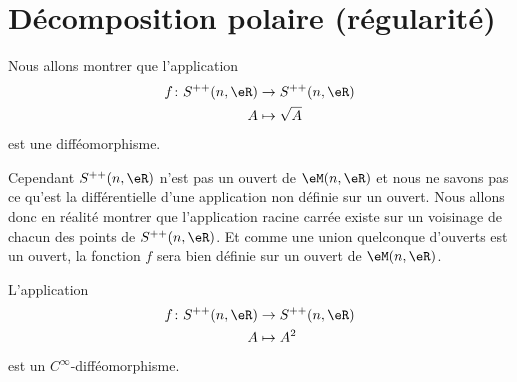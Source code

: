 \section{Décomposition polaire (régularité)}

\begin{normaltext}      \label{NomDJMUooTRUVkS}
    Nous allons montrer que l'application
    \begin{equation}
        \begin{aligned}
            f\colon S^{++}(n,\eR)&\to S^{++}(n,\eR) \\
            A&\mapsto \sqrt{A}
        \end{aligned}
    \end{equation}
    est une difféomorphisme.

    Cependant \( S^{++}(n,\eR)\) n'est pas un ouvert de \( \eM(n,\eR)\) et nous ne savons pas ce qu'est la différentielle d'une application non définie sur un ouvert. Nous allons donc en réalité montrer que l'application racine carrée existe sur un voisinage de chacun des points de \( S^{++}(n,\eR)\). Et comme une union quelconque d'ouverts est un ouvert, la fonction \( f\) sera bien définie sur un ouvert de \( \eM(n,\eR)\).
\end{normaltext}

\begin{lemma}       \label{LemLBFOooDdNcgy}
    L'application
    \begin{equation}
        \begin{aligned}
            f\colon S^{++}(n,\eR)&\to S^{++}(n,\eR) \\
            A&\mapsto A^2
        \end{aligned}
    \end{equation}
    est un \(  C^{\infty}\)-difféomorphisme.
\end{lemma}

